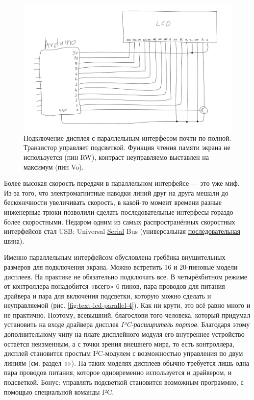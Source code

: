 \begin{figure}
  \centering
  \includegraphics{sketches/text-lcd-parallel-8}
  \caption{Подключение дисплея с параллельным интерфесом почти по полной. Транзистор управляет подсветкой. Функция чтения памяти экрана не используется (пин RW), контраст неуправляемо выставлен на максимум (пин Vo).}
  \label{fig:text-lcd-parallel-8}
\end{figure}

\begin{Note}
  Более высокая скорость передачи в параллельном интерфейсе — это уже миф. Из-за того, что электромагнитные наводки линий друг на друга мешали до бесконечности увеличивать скорость, в какой-то момент времени разные инженерные трюки позволили сделать последовательные интерфесы гораздо более скоростными. Недаром одним из самых распространённых скоростных интерфейсов стал USB: Universal \underline{Serial} Bus (универсальная \underline{последовательная} шина).
\end{Note}

Именно параллельным интерфейсом обусловлена гребёнка внушительных размеров для подключения экрана. Можно встретить 16 и 20-пиновые модели дисплеев. На практике не обязательно подключать все. В четырёхбитном режиме от контроллера понадобится «всего» 6 пинов, пара проводов для питания драйвера и пара для включения подсветки, которую можно сделать и неуправляемой (рис. \ref{fig:text-lcd-parallel-4}). Как ни крути, это всё равно много и не практично. Поэтому, всевышний, благослови того человека, который придумал установить на входе драйвера дисплея \emph{I²C-расширитель портов}. Благодаря этому дополнительному чипу на плате дисплейного модуля его внутреннее устройство остаётся неизменным, а с точки зрения внешнего мира, то есть контроллера, дисплей становится простым I²C-модулем с возможностью управления по двум линиям (см. раздел «»). На таких моделях дисплеев обычно требуется лишь одна пара проводов питания, которое одновременно используется и драйвером, и подсветкой. Бонус: управлять подсветкой становится возможным программно, с помощью специальной команды I²C.

